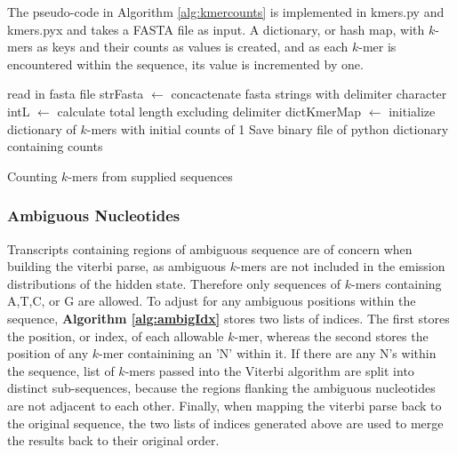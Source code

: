The pseudo-code in Algorithm \ref{alg:kmercounts} is implemented in kmers.py and kmers.pyx and takes a FASTA file as input. A dictionary, or hash map, with $k$-mers as keys and their counts as values is created, and as each $k$-mer is encountered within the sequence, its value is incremented by one.

\begin{algorithm}[h]
\DontPrintSemicolon
{}
\SetAlgoLined
{}
 read in fasta file\;
 strFasta $\leftarrow$ concactenate fasta strings with delimiter character\;
 intL $\leftarrow$ calculate total length excluding delimiter\;
 dictKmerMap $\leftarrow$ initialize dictionary of $k$-mers with initial counts of 1\;
 Save binary file of python dictionary containing counts
 \caption{Counting $k$-mers from supplied sequences}
 \label{alg:kmercounts}
\end{algorithm}

\subsubsection{Ambiguous Nucleotides}
Transcripts containing regions of ambiguous sequence are of concern when building the viterbi parse, as ambiguous $k$-mers are not included in the emission distributions of the hidden state. Therefore only sequences of $k$-mers containing A,T,C, or G are allowed. To adjust for any ambiguous positions within the sequence, \textbf{Algorithm \ref{alg:ambigIdx}} stores two lists of indices. The first stores the position, or index, of each allowable $k$-mer, whereas the second stores the position of any $k$-mer containining an 'N' within it. If there are any N's within the sequence, list of $k$-mers passed into the Viterbi algorithm are split into distinct sub-sequences, because the regions flanking the ambiguous nucleotides are not adjacent to each other. Finally, when mapping the viterbi parse back to the original sequence, the two lists of indices generated above are used to merge the results back to their original order.

